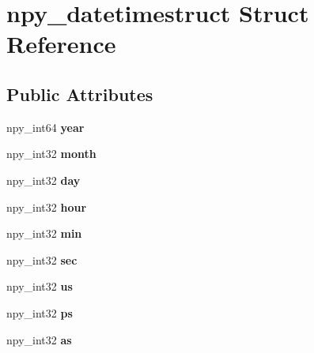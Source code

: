 \hypertarget{structnpy__datetimestruct}{}\section{npy\+\_\+datetimestruct Struct Reference}
\label{structnpy__datetimestruct}
\subsection*{Public Attributes}
\begin{DoxyCompactItemize}
\item 
npy\+\_\+int64 {\bfseries year}\hypertarget{structnpy__datetimestruct_af6d1283c07f9b8e459ebb152b45575b5}{}\label{structnpy__datetimestruct_af6d1283c07f9b8e459ebb152b45575b5}

\item 
npy\+\_\+int32 {\bfseries month}\hypertarget{structnpy__datetimestruct_a791ad6592744bff63903a49ff759a35f}{}\label{structnpy__datetimestruct_a791ad6592744bff63903a49ff759a35f}

\item 
npy\+\_\+int32 {\bfseries day}\hypertarget{structnpy__datetimestruct_a8f943a5812cc3848e89c4efdb3a33621}{}\label{structnpy__datetimestruct_a8f943a5812cc3848e89c4efdb3a33621}

\item 
npy\+\_\+int32 {\bfseries hour}\hypertarget{structnpy__datetimestruct_ae30fd8fa505ae013c161cde32f2536f8}{}\label{structnpy__datetimestruct_ae30fd8fa505ae013c161cde32f2536f8}

\item 
npy\+\_\+int32 {\bfseries min}\hypertarget{structnpy__datetimestruct_a743a85580f2ce0b8f3e328324c068f7e}{}\label{structnpy__datetimestruct_a743a85580f2ce0b8f3e328324c068f7e}

\item 
npy\+\_\+int32 {\bfseries sec}\hypertarget{structnpy__datetimestruct_a0edb35e46eba4fdeb241c980933474b9}{}\label{structnpy__datetimestruct_a0edb35e46eba4fdeb241c980933474b9}

\item 
npy\+\_\+int32 {\bfseries us}\hypertarget{structnpy__datetimestruct_a41baa454b6ef074faacb2ce2dc302a8f}{}\label{structnpy__datetimestruct_a41baa454b6ef074faacb2ce2dc302a8f}

\item 
npy\+\_\+int32 {\bfseries ps}\hypertarget{structnpy__datetimestruct_a9f73efdf6eb26ba47f7c3e1910d3ca4e}{}\label{structnpy__datetimestruct_a9f73efdf6eb26ba47f7c3e1910d3ca4e}

\item 
npy\+\_\+int32 {\bfseries as}\hypertarget{structnpy__datetimestruct_a19866d149795e7489475ca370c87c01d}{}\label{structnpy__datetimestruct_a19866d149795e7489475ca370c87c01d}

\end{DoxyCompactItemize}


